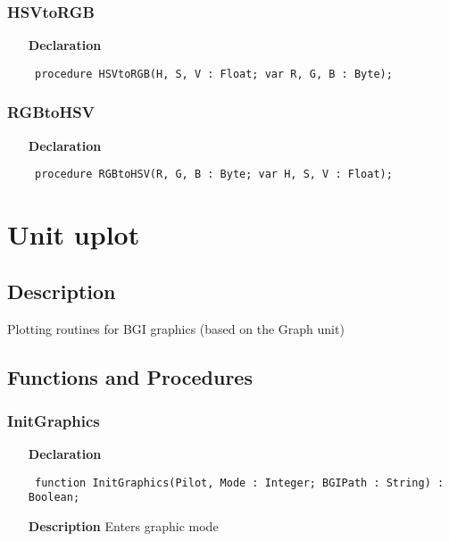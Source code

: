 \documentclass[12pt,a4paper,oneside]{report}
\newcommand{\declarationitem}[1]{\textbf{#1}}
\newcommand{\descriptiontitle}[1]{\textbf{#1}}
\newcommand{\code}[1]{\texttt{#1}}
\begin{document}
\subsubsection{HSVtoRGB}
\label{uhsvrgb-HSVtoRGB}
\begin{itemize}\item[\declarationitem{Declaration}\hfill]
	\begin{flushleft}
		\code{
			procedure HSVtoRGB(H, S, V : Float; var R, G, B : Byte);}
		
	\end{flushleft}
	
\end{itemize}
\subsubsection{RGBtoHSV}
\label{uhsvrgb-RGBtoHSV}
\begin{itemize}\item[\declarationitem{Declaration}\hfill]
	\begin{flushleft}
		\code{
			procedure RGBtoHSV(R, G, B : Byte; var H, S, V : Float);}
		
	\end{flushleft}
	
\end{itemize}
\section{Unit uplot}
\label{uplot}
\subsection{Description}
Plotting routines for BGI graphics (based on the Graph unit) \subsection{Functions and Procedures}
\subsubsection{InitGraphics}
\label{uplot-InitGraphics}
\begin{itemize}\item[\declarationitem{Declaration}\hfill]
	\begin{flushleft}
		\code{
			function InitGraphics(Pilot, Mode : Integer; BGIPath : String) : Boolean;}
		
	\end{flushleft}
	
	\par
	\item[\descriptiontitle{Description}]
	Enters graphic mode
\end{itemize}
\end{document}
